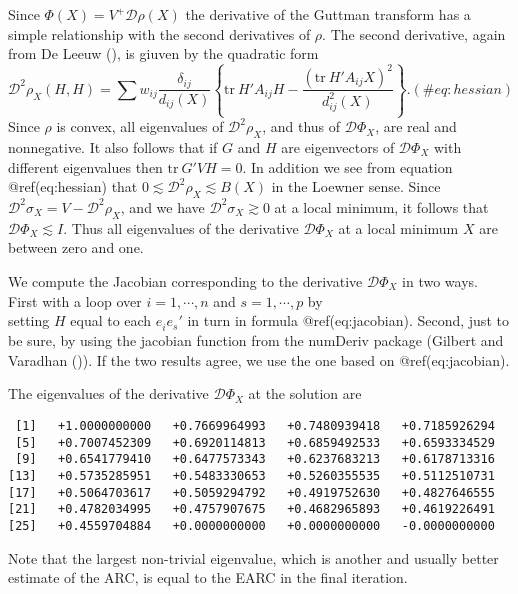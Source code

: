 \documentclass[
  12pt,
  letterpaper,
  DIV=11,
  numbers=noendperiod]{scrartcl}
\begin{document}
Since \(\Phi(X)=V^+\mathcal{D}\rho(X)\) the derivative of the Guttman
transform has a simple relationship with the second derivatives of
\(\rho\). The second derivative, again from De Leeuw
(), is giuven by the quadratic form
\begin{equation}
\mathcal{D}^2\rho_X(H,H)=\sum w_{ij}\frac{\delta_{ij}}{d_{ij}(X)}\left\{\text{tr}\ H'A_{ij}H-\frac{(\text{tr}\ H'A_{ij}X)^2}{d_{ij}^2(X)}\right\}.
(\#eq:hessian)
\end{equation} Since \(\rho\) is convex, all eigenvalues of
\(\mathcal{D}^2\rho_X\), and thus of \(\mathcal{D}\Phi_X\), are real and
nonnegative. It also follows that if \(G\) and \(H\) are eigenvectors of
\(\mathcal{D}\Phi_X\) with different eigenvalues then
\(\text{tr}\ G'VH=0\). In addition we see from equation @ref(eq:hessian)
that \(0\lesssim\mathcal{D}^2\rho_X\lesssim B(X)\) in the Loewner sense.
Since \(\mathcal{D}^2\sigma_X=V-\mathcal{D}^2\rho_X\), and we have
\(\mathcal{D}^2\sigma_X\gtrsim 0\) at a local minimum, it follows that
\(\mathcal{D}\Phi_X\lesssim I\). Thus all eigenvalues of the derivative
\(\mathcal{D}\Phi_X\) at a local minimum \(X\) are between zero and one.

We compute the Jacobian corresponding to the derivative
\(\mathcal{D}\Phi_X\) in two ways. First with a loop over
\(i=1,\cdots,n\) and \(s=1,\cdots,p\) by\\
setting \(H\) equal to each \(e_i^{\ }e_s'\) in turn in formula
@ref(eq:jacobian). Second, just to be sure, by using the jacobian
function from the numDeriv package (Gilbert and Varadhan
()). If the two results agree,
we use the one based on @ref(eq:jacobian).

The eigenvalues of the derivative \(\mathcal{D}\Phi_X\) at the solution
are

\begin{verbatim}
 [1]   +1.0000000000   +0.7669964993   +0.7480939418   +0.7185926294
 [5]   +0.7007452309   +0.6920114813   +0.6859492533   +0.6593334529
 [9]   +0.6541779410   +0.6477573343   +0.6237683213   +0.6178713316
[13]   +0.5735285951   +0.5483330653   +0.5260355535   +0.5112510731
[17]   +0.5064703617   +0.5059294792   +0.4919752630   +0.4827646555
[21]   +0.4782034995   +0.4757907675   +0.4682965893   +0.4619226491
[25]   +0.4559704884   +0.0000000000   +0.0000000000   -0.0000000000
\end{verbatim}

Note that the largest non-trivial eigenvalue, which is another and
usually better estimate of the ARC, is equal to the EARC in the final
iteration.
\end{document}

